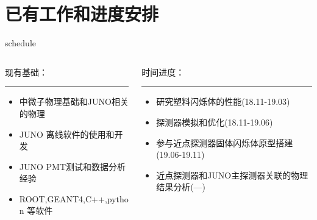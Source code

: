 \documentclass[11pt,compress,xcolor=x11names,UTF8]{beamer}
\begin{document}
%
\section{已有工作和进度安排}
\begin{frame}{schedule}

\begin{columns}
\begin{column}{.5\textwidth}
现有基础：
\vspace{.5cm}
\hrule{\textwidth}
\vspace{.5cm}
\begin{itemize}
\item 中微子物理基础和JUNO相关的物理
\item JUNO 离线软件的使用和开发
\item JUNO PMT测试和数据分析经验
\item ROOT,GEANT4,C++,python 等软件 
\end{itemize}

\end{column}
\begin{column}{.5\textwidth}
时间进度：
\vspace{.5cm}
\hrule{\textwidth}
\vspace{.5cm}
\begin{itemize}
\item 研究塑料闪烁体的性能(18.11-19.03)
\item 探测器模拟和优化(18.11-19.06)
\item 参与近点探测器固体闪烁体原型搭建(19.06-19.11)
\item  近点探测器和JUNO主探测器关联的物理结果分析(---)
\end{itemize}
\end{column}
\end{columns}
\end{frame}
\end{document}
